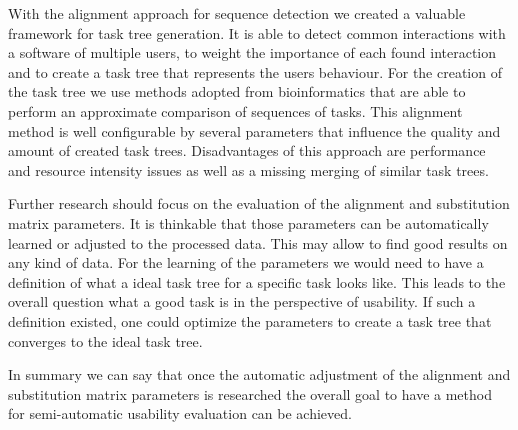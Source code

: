 With the alignment approach for sequence detection we created a valuable framework for task tree generation. 
It is able to detect common interactions with a software of multiple users, to weight the importance of each found interaction and to create a task tree that represents
the users behaviour.
For the creation of the task tree we use methods adopted from bioinformatics that are able to perform an approximate comparison of sequences of tasks. 
This alignment method is well configurable by several parameters that influence the quality and amount of created task trees.
Disadvantages of this approach are performance and resource intensity issues as well as a missing merging of similar task trees.

Further research should focus on the evaluation of the alignment and substitution matrix parameters. 
It is thinkable that those parameters can be automatically learned or adjusted to the processed data.
This may allow to find good results on any kind of data. 
For the learning of the parameters we would need to have a definition of what a ideal task tree for a specific task looks like.
This leads to the overall question what a good task is in the perspective of usability.
If such a definition existed, one could optimize the parameters to create a task tree that converges to the ideal task tree.

In summary we can say that once the automatic adjustment of the alignment and substitution matrix parameters is researched the overall goal to have a method for semi-automatic usability evaluation can be achieved.



